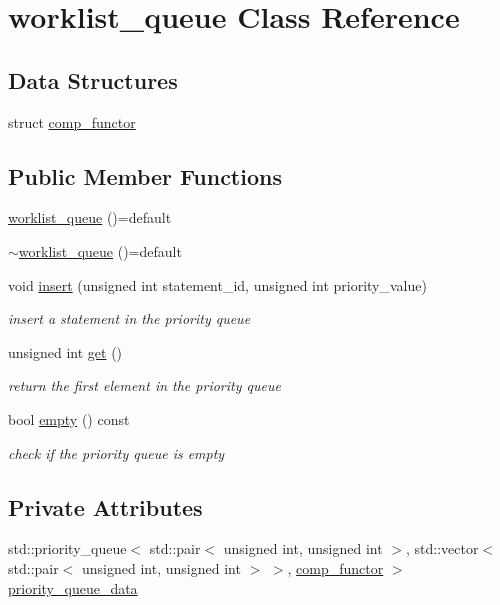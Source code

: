 \hypertarget{classworklist__queue}{}\section{worklist\+\_\+queue Class Reference}
\label{classworklist__queue}
\subsection*{Data Structures}
\begin{DoxyCompactItemize}
\item 
struct \hyperlink{structworklist__queue_1_1comp__functor}{comp\+\_\+functor}
\end{DoxyCompactItemize}
\subsection*{Public Member Functions}
\begin{DoxyCompactItemize}
\item 
\hyperlink{classworklist__queue_af4998ce70f6f258196aa81fa1d8a281b}{worklist\+\_\+queue} ()=default
\item 
\hyperlink{classworklist__queue_ab08f31a3aa3ff9cfea2bfe610e91cd85}{$\sim$worklist\+\_\+queue} ()=default
\item 
void \hyperlink{classworklist__queue_a544824f2c8a6131ddb2fc05d101622a4}{insert} (unsigned int statement\+\_\+id, unsigned int priority\+\_\+value)
\begin{DoxyCompactList}\small\item\em insert a statement in the priority queue \end{DoxyCompactList}\item 
unsigned int \hyperlink{classworklist__queue_afcc59df2bdec60bbe84e3b2b56c352a3}{get} ()
\begin{DoxyCompactList}\small\item\em return the first element in the priority queue \end{DoxyCompactList}\item 
bool \hyperlink{classworklist__queue_a660a0416ab672fb889156568c9a5408c}{empty} () const
\begin{DoxyCompactList}\small\item\em check if the priority queue is empty \end{DoxyCompactList}\end{DoxyCompactItemize}
\subsection*{Private Attributes}
\begin{DoxyCompactItemize}
\item 
std\+::priority\+\_\+queue$<$ std\+::pair$<$ unsigned int, unsigned int $>$, std\+::vector$<$ std\+::pair$<$ unsigned int, unsigned int $>$ $>$, \hyperlink{structworklist__queue_1_1comp__functor}{comp\+\_\+functor} $>$ \hyperlink{classworklist__queue_abe62bff448ef8018e3069fd27efb4341}{priority\+\_\+queue\+\_\+data}
\end{DoxyCompactItemize}


